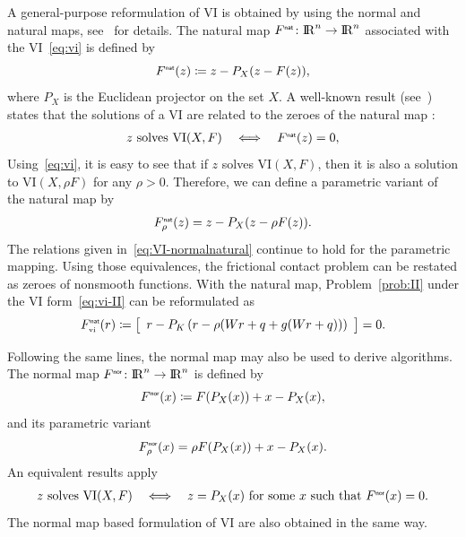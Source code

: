 {A general-purpose reformulation of VI is obtained by using the normal and natural maps, see~\cite{Facchinei.Pang2003} for details.
 The natural map $F^{\hbox{\sf \tiny{nat}}}\colon \mathrm{I\!R}^n\to\mathrm{I\!R}^n$ associated with the VI~\eqref{eq:vi} is defined by
\begin{equation}
  \label{eq:naturalmap}
  F^\nat(z) \coloneqq z - P_{X}(z-F(z)),
\end{equation}
where $P_X$ is the Euclidean projector on the set $X$. A well-known result (see~\cite{Facchinei.Pang2003}) states that the solutions of a VI are related to the zeroes of the natural map :
\begin{equation}
  \label{eq:VI-normalnatural}
  \begin{array}{c}
  z \text{ solves } \mathrm{VI}(X,F)\quad \Longleftrightarrow\quad  F^\nat(z)=0,
\end{array}
\end{equation}
Using~\eqref{eq:vi}, it is easy to see that if $z$ solves  $\mathrm{VI}(X,F)$, then it is  also a solution to $\mathrm{VI}(X,\rho F)$ for any $\rho > 0$.
Therefore, we can define a parametric variant of the natural map by
\begin{equation}
  \label{eq:parametrized-naturalnormalmap}
  \begin{array}{l}
    F_\rho^\nat(z) = z - P_{X}(z-\rho F(z)).
  \end{array}
\end{equation}
The relations given in~\eqref{eq:VI-normalnatural} continue to hold for the parametric mapping.
Using those {equivalences}, the frictional contact problem can be restated as zeroes of nonsmooth functions.
With the natural map, Problem~\ref{prob:II} under the VI form~\eqref{eq:vi-II} can be reformulated as
\begin{equation}
  \label{eq:natural-II}
  F_\vitwo^\nat(r) \coloneqq   \left[
  \begin{array}{l} 
    r - P_{K}\left(r  - \rho (W r +q + g(W r +q))\right) 
  \end{array}\right] 
  = 0.
\end{equation}


  Following the same lines, the normal map may also be used to derive algorithms. The normal map $F^{\hbox{\sf \tiny{nor}}}\colon \mathrm{I\!R}^n\to\mathrm{I\!R}^n$ is defined by
\begin{equation}
  \label{eq:normalmap}
  F^\nor(x) \coloneqq F(P_X(x)) + x - P_{X}(x),
\end{equation}
and its parametric variant
\begin{equation}
  \label{eq:normalmap-b}
 F_\rho^\nor(x) = \rho F(P_X(x)) + x - P_{X}(x).
\end{equation}
An equivalent results apply
 \begin{equation}
  \label{eq:VI-normalmap}
  \begin{array}{c}
  z \text{ solves } \mathrm{VI}(X,F)\quad \Longleftrightarrow \quad z = P_X(x) \text{ for some } x \text{ such that } F^\nor(x)=0.
\end{array}
\end{equation}
The normal map based formulation of VI are also obtained in the same way. 



}
